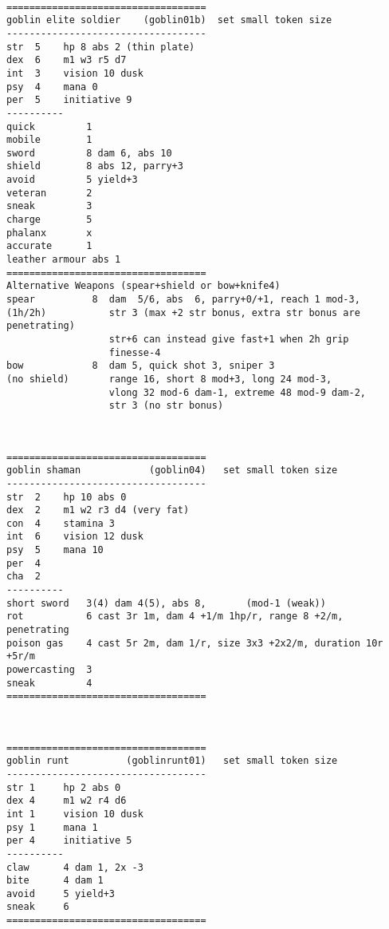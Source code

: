 \

\pagebreak[1]
\tiny \begin{samepage} \begin{verbatim}
===================================
goblin elite soldier    (goblin01b)  set small token size
-----------------------------------
str  5    hp 8 abs 2 (thin plate)
dex  6    m1 w3 r5 d7
int  3    vision 10 dusk
psy  4    mana 0
per  5    initiative 9
----------
quick         1
mobile        1
sword         8 dam 6, abs 10
shield        8 abs 12, parry+3
avoid         5 yield+3
veteran       2
sneak         3
charge        5
phalanx       x
accurate      1
leather armour abs 1
===================================
Alternative Weapons (spear+shield or bow+knife4)
spear          8  dam  5/6, abs  6, parry+0/+1, reach 1 mod-3,
(1h/2h)           str 3 (max +2 str bonus, extra str bonus are penetrating)
                  str+6 can instead give fast+1 when 2h grip
                  finesse-4
bow            8  dam 5, quick shot 3, sniper 3
(no shield)       range 16, short 8 mod+3, long 24 mod-3,
                  vlong 32 mod-6 dam-1, extreme 48 mod-9 dam-2,
                  str 3 (no str bonus)
\end{verbatim} \end{samepage} \normalsize

\

\pagebreak[1]
\tiny \begin{samepage} \begin{verbatim}
===================================
goblin shaman            (goblin04)   set small token size
-----------------------------------
str  2    hp 10 abs 0
dex  2    m1 w2 r3 d4 (very fat)
con  4    stamina 3
int  6    vision 12 dusk
psy  5    mana 10
per  4
cha  2
----------
short sword   3(4) dam 4(5), abs 8,       (mod-1 (weak))
rot           6 cast 3r 1m, dam 4 +1/m 1hp/r, range 8 +2/m, penetrating
poison gas    4 cast 5r 2m, dam 1/r, size 3x3 +2x2/m, duration 10r +5r/m
powercasting  3
sneak         4
===================================
\end{verbatim} \end{samepage} \normalsize

\

\pagebreak[1]
\tiny \begin{samepage} \begin{verbatim}
===================================
goblin runt          (goblinrunt01)   set small token size
-----------------------------------
str 1     hp 2 abs 0
dex 4     m1 w2 r4 d6
int 1     vision 10 dusk
psy 1     mana 1
per 4     initiative 5
----------
claw      4 dam 1, 2x -3
bite      4 dam 1
avoid     5 yield+3
sneak     6
===================================
\end{verbatim} \end{samepage} \normalsize

